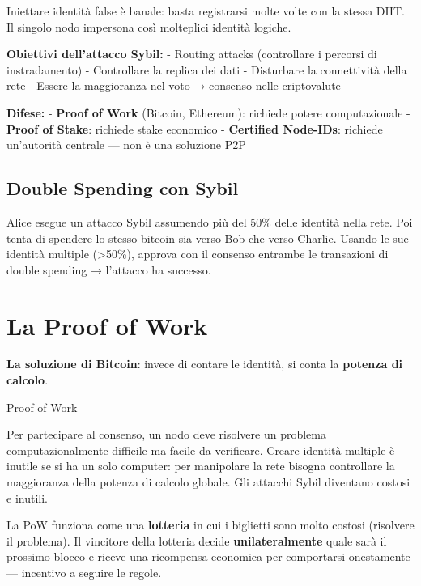 \documentclass[
  italian,
  openany]{book}
\begin{document}
Iniettare identità false è banale: basta registrarsi molte volte con la
stessa DHT. Il singolo nodo impersona così molteplici identità logiche.

\textbf{Obiettivi dell'attacco Sybil:} - Routing attacks (controllare i
percorsi di instradamento) - Controllare la replica dei dati -
Disturbare la connettività della rete - Essere la maggioranza nel voto →
consenso nelle criptovalute

\textbf{Difese:} - \textbf{Proof of Work} (Bitcoin, Ethereum): richiede
potere computazionale - \textbf{Proof of Stake}: richiede stake
economico - \textbf{Certified Node-IDs}: richiede un'autorità centrale
--- non è una soluzione P2P

\subsection{Double Spending con Sybil}\label{double-spending-con-sybil}

Alice esegue un attacco Sybil assumendo più del 50\% delle identità
nella rete. Poi tenta di spendere lo stesso bitcoin sia verso Bob che
verso Charlie. Usando le sue identità multiple (\textgreater50\%),
approva con il consenso entrambe le transazioni di double spending →
l'attacco ha successo.

\section{La Proof of Work}\label{la-proof-of-work}

\textbf{La soluzione di Bitcoin}: invece di contare le identità, si
conta la \textbf{potenza di calcolo}.

\begin{calloutdefinition}{Proof of Work}

Per partecipare al consenso, un nodo deve risolvere un problema
computazionalmente difficile ma facile da verificare. Creare identità
multiple è inutile se si ha un solo computer: per manipolare la rete
bisogna controllare la maggioranza della potenza di calcolo globale. Gli
attacchi Sybil diventano costosi e inutili.

\end{calloutdefinition}

La PoW funziona come una \textbf{lotteria} in cui i biglietti sono molto
costosi (risolvere il problema). Il vincitore della lotteria decide
\textbf{unilateralmente} quale sarà il prossimo blocco e riceve una
ricompensa economica per comportarsi onestamente --- incentivo a seguire
le regole.
\end{document}
